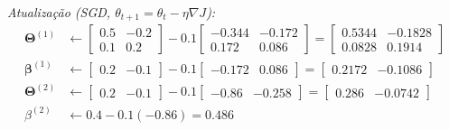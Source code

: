 \documentclass{dlproblemset}
\begin{document}
\begin{enumerate}[1)]
    \textit{Atualização (SGD, $\theta_{t+1}=\theta_t-\eta\nabla J$):}
    \begin{align*}
        \mathbf{\Theta}^{(1)} &\leftarrow \begin{bmatrix}0.5 & -0.2\\ 0.1 & 0.2\end{bmatrix} - 0.1\begin{bmatrix}-0.344 & -0.172\\ 0.172 & 0.086\end{bmatrix} = \begin{bmatrix}0.5344 & -0.1828\\ 0.0828 & 0.1914\end{bmatrix}\\
        \boldsymbol{\beta}^{(1)} &\leftarrow \begin{bmatrix}0.2 & -0.1\end{bmatrix} - 0.1\begin{bmatrix}-0.172 & 0.086\end{bmatrix} = \begin{bmatrix}0.2172 & -0.1086\end{bmatrix}\\
        \mathbf{\Theta}^{(2)} &\leftarrow \begin{bmatrix}0.2 & -0.1\end{bmatrix} - 0.1\begin{bmatrix}-0.86 & -0.258\end{bmatrix} = \begin{bmatrix}0.286 & -0.0742\end{bmatrix}\\
        \beta^{(2)} &\leftarrow 0.4 - 0.1(-0.86) = 0.486
    \end{align*}


\end{enumerate}
\end{document}
